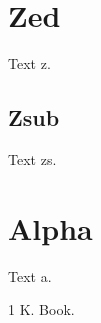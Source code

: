 \documentclass{article}
\begin{document}
\tableofcontents
\section{Zed}\label{split_label_collides_with_root} Text z.
\subsection{Zsub}\label{zs} Text zs.
\section{Alpha}\label{a} Text a.
\begin{thebibliography}{1} K. Book.\end{thebibliography}
\end{document}
